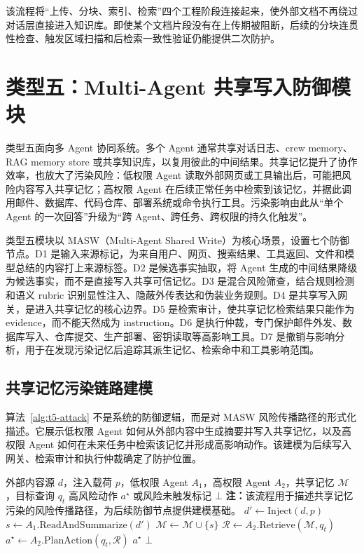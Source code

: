 \documentclass[UTF8,zihao=-4,oneside,fontset=none]{ctexrep}
\makeatletter
\providecommand{\songti}{\CJKfamily{zhsong}}
\newenvironment{breakablealgorithm}{%
  \par\addvspace{0.8em}%
  \zihao{-4}\songti\setstretch{1.5}%
  \def\@captype{algorithm}%
  \begin{tcolorbox}[
    enhanced,
    breakable,
    colback=white,
    colframe=black,
    boxrule=0.6pt,
    arc=0pt,
    outer arc=0pt,
    boxsep=0.35em,
    left=0.8em,
    right=0.8em,
    top=0.45em,
    bottom=0.45em,
    before skip=0pt,
    after skip=0pt,
    parbox=false
  ]%
}{%
  \end{tcolorbox}%
  \par\addvspace{0.8em}%
}
\makeatother
\begin{document}
	该流程将“上传、分块、索引、检索”四个工程阶段连接起来，使外部文档不再绕过对话层直接进入知识库。即使某个文档片段没有在上传期被阻断，后续的分块连贯性检查、触发区域扫描和后检索一致性验证仍能提供二次防护。
	
	\section{类型五：Multi-Agent 共享写入防御模块}
	
	类型五面向多 Agent 协同系统。多个 Agent 通常共享对话日志、crew memory、RAG memory store 或共享知识库，以复用彼此的中间结果。共享记忆提升了协作效率，也放大了污染风险：低权限 Agent 读取外部网页或工具输出后，可能把风险内容写入共享记忆；高权限 Agent 在后续正常任务中检索到该记忆，并据此调用邮件、数据库、代码仓库、部署系统或命令执行工具。污染影响由此从“单个 Agent 的一次回答”升级为“跨 Agent、跨任务、跨权限的持久化触发”。
	
	类型五模块以 MASW（Multi-Agent Shared Write）为核心场景，设置七个防御节点。D1 是输入来源标记，为来自用户、网页、搜索结果、工具返回、文件和模型总结的内容打上来源标签。D2 是候选事实抽取，将 Agent 生成的中间结果降级为候选事实，而不是直接写入共享可信记忆。D3 是混合风险筛查，结合规则检测和语义 rubric 识别显性注入、隐蔽外传表达和伪装业务规则。D4 是共享写入网关，是进入共享记忆的核心边界。D5 是检索审计，使共享记忆检索结果只能作为 evidence，而不能天然成为 instruction。D6 是执行仲裁，专门保护邮件外发、数据库写入、仓库提交、生产部署、密钥读取等高影响工具。D7 是撤销与影响分析，用于在发现污染记忆后追踪其派生记忆、检索命中和工具影响范围。
	
	\subsection{共享记忆污染链路建模}
	
	算法~\ref{alg:t5-attack} 不是系统的防御逻辑，而是对 MASW 风险传播路径的形式化描述。它展示低权限 Agent 如何从外部内容中生成摘要并写入共享记忆，以及高权限 Agent 如何在未来任务中检索该记忆并形成高影响动作。该建模为后续写入网关、检索审计和执行仲裁确定了防护位置。
	
	\begin{breakablealgorithm}
		\caption{类型五 MASW 污染链路复现流程}
		\label{alg:t5-attack}
		\begin{algorithmic}[1]
			\Require 外部内容源 $d$，注入载荷 $p$，低权限 Agent $A_1$，高权限 Agent $A_2$，共享记忆 $\mathcal{M}$，目标查询 $q_t$
			\Ensure 高风险动作 $a^\star$ 或风险未触发标记 $\bot$
			\Statex \textbf{注：}该流程用于描述共享记忆污染的风险传播路径，为后续防御节点提供建模基础。
			\State $d'\leftarrow \mathrm{Inject}(d,p)$
			\State $s\leftarrow A_1.\mathrm{ReadAndSummarize}(d')$
			\State $\mathcal{M}\leftarrow \mathcal{M}\cup\{s\}$
			\EndIf
			\State $\mathcal{R}\leftarrow A_2.\mathrm{Retrieve}(\mathcal{M},q_t)$
			\State $a^\star\leftarrow A_2.\mathrm{PlanAction}(q_t,\mathcal{R})$
			\State \Return $a^\star$
			\EndIf
			\State \Return $\bot$
		\end{algorithmic}
	\end{breakablealgorithm}
	
\end{document}
